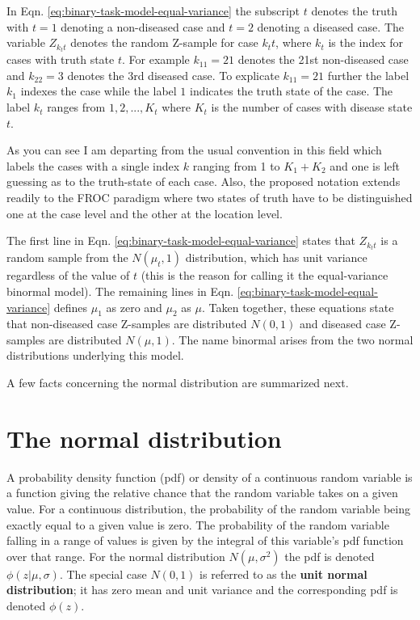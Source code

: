 \documentclass[
]{book}
\begin{document}
In Eqn. \eqref{eq:binary-task-model-equal-variance} the subscript \(t\) denotes the truth with \(t = 1\) denoting a non-diseased case and \(t = 2\) denoting a diseased case. The variable \(Z_{k_tt}\) denotes the random Z-sample for case \(k_tt\), where \(k_t\) is the index for cases with truth state \(t\). For example \(k_11=21\) denotes the 21st non-diseased case and \(k_22=3\) denotes the 3rd diseased case. To explicate \(k_11=21\) further the label \(k_1\) indexes the case while the label \(1\) indicates the truth state of the case. The label \(k_t\) ranges from \(1,2,...,K_t\) where \(K_t\) is the number of cases with disease state \(t\).

As you can see I am departing from the usual convention in this field which labels the cases with a single index \(k\) ranging from 1 to \(K_1+K_2\) and one is left guessing as to the truth-state of each case. Also, the proposed notation extends readily to the FROC paradigm where two states of truth have to be distinguished one at the case level and the other at the location level.

The first line in Eqn. \eqref{eq:binary-task-model-equal-variance} states that \(Z_{k_tt}\) is a random sample from the \(N(\mu_t,1)\) distribution, which has unit variance regardless of the value of \(t\) (this is the reason for calling it the equal-variance binormal model). The remaining lines in Eqn. \eqref{eq:binary-task-model-equal-variance} defines \(\mu_1\) as zero and \(\mu_2\) as \(\mu\). Taken together, these equations state that non-diseased case Z-samples are distributed \(N(0,1)\) and diseased case Z-samples are distributed \(N(\mu,1)\). The name binormal arises from the two normal distributions underlying this model.

A few facts concerning the normal distribution are summarized next.

\hypertarget{binary-task-model-normal-distribution}{%
\section{The normal distribution}\label{binary-task-model-normal-distribution}}

A probability density function (pdf) or density of a continuous random variable is a function giving the relative chance that the random variable takes on a given value. For a continuous distribution, the probability of the random variable being exactly equal to a given value is zero. The probability of the random variable falling in a range of values is given by the integral of this variable's pdf function over that range. For the normal distribution \(N(\mu,\sigma^2)\) the pdf is denoted \(\phi(z|\mu,\sigma)\). The special case \(N(0,1)\) is referred to as the \textbf{unit normal distribution}; it has zero mean and unit variance and the corresponding pdf is denoted \(\phi(z)\).
\end{document}
